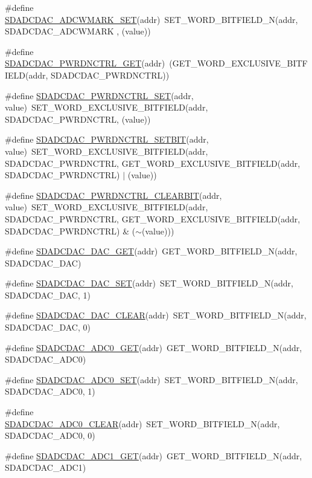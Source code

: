 \begin{DoxyCompactItemize}
\item 
\#define \hyperlink{a00568_a40cf8d4bbc94a9caa3852b909b409409}{SDADCDAC\_\-ADCWMARK\_\-SET}(addr)~SET\_\-WORD\_\-BITFIELD\_\-N(addr, SDADCDAC\_\-ADCWMARK , (value))
\item 
\#define \hyperlink{a00568_adffdefe93093f38d033c051b903181ce}{SDADCDAC\_\-PWRDNCTRL\_\-GET}(addr)~(GET\_\-WORD\_\-EXCLUSIVE\_\-BITFIELD(addr, SDADCDAC\_\-PWRDNCTRL))
\item 
\#define \hyperlink{a00568_a576679d8e1fc5ba989feee7c0ddc012c}{SDADCDAC\_\-PWRDNCTRL\_\-SET}(addr, value)~SET\_\-WORD\_\-EXCLUSIVE\_\-BITFIELD(addr, SDADCDAC\_\-PWRDNCTRL, (value))
\item 
\#define \hyperlink{a00568_a431b5c676057a3493dc5c2c76cd5497f}{SDADCDAC\_\-PWRDNCTRL\_\-SETBIT}(addr, value)~SET\_\-WORD\_\-EXCLUSIVE\_\-BITFIELD(addr, SDADCDAC\_\-PWRDNCTRL, GET\_\-WORD\_\-EXCLUSIVE\_\-BITFIELD(addr, SDADCDAC\_\-PWRDNCTRL) $|$ (value))
\item 
\#define \hyperlink{a00568_a41f7d02f9331ad4aa2558baed5b3c7f8}{SDADCDAC\_\-PWRDNCTRL\_\-CLEARBIT}(addr, value)~SET\_\-WORD\_\-EXCLUSIVE\_\-BITFIELD(addr, SDADCDAC\_\-PWRDNCTRL, GET\_\-WORD\_\-EXCLUSIVE\_\-BITFIELD(addr, SDADCDAC\_\-PWRDNCTRL) \& ($\sim$(value)))
\item 
\#define \hyperlink{a00568_a51fe52556a9251eca94d4b4ee2937d42}{SDADCDAC\_\-DAC\_\-GET}(addr)~GET\_\-WORD\_\-BITFIELD\_\-N(addr, SDADCDAC\_\-DAC)
\item 
\#define \hyperlink{a00568_a6163b9ad505e734676c31a8e9666bd53}{SDADCDAC\_\-DAC\_\-SET}(addr)~SET\_\-WORD\_\-BITFIELD\_\-N(addr, SDADCDAC\_\-DAC, 1)
\item 
\#define \hyperlink{a00568_aaea44aecfc1b6217d1312982f67ab8ad}{SDADCDAC\_\-DAC\_\-CLEAR}(addr)~SET\_\-WORD\_\-BITFIELD\_\-N(addr, SDADCDAC\_\-DAC, 0)
\item 
\#define \hyperlink{a00568_afbee08cf2d578575688b49a37c311827}{SDADCDAC\_\-ADC0\_\-GET}(addr)~GET\_\-WORD\_\-BITFIELD\_\-N(addr, SDADCDAC\_\-ADC0)
\item 
\#define \hyperlink{a00568_a70bf3299ea21ff6763b8bcb9e0c4e176}{SDADCDAC\_\-ADC0\_\-SET}(addr)~SET\_\-WORD\_\-BITFIELD\_\-N(addr, SDADCDAC\_\-ADC0, 1)
\item 
\#define \hyperlink{a00568_ae46a8d7ce04c43fea08410d70cf50a89}{SDADCDAC\_\-ADC0\_\-CLEAR}(addr)~SET\_\-WORD\_\-BITFIELD\_\-N(addr, SDADCDAC\_\-ADC0, 0)
\item 
\#define \hyperlink{a00568_a11a9262119049ab4bd4a45c4aadfc6e7}{SDADCDAC\_\-ADC1\_\-GET}(addr)~GET\_\-WORD\_\-BITFIELD\_\-N(addr, SDADCDAC\_\-ADC1)

\end{DoxyCompactItemize}
